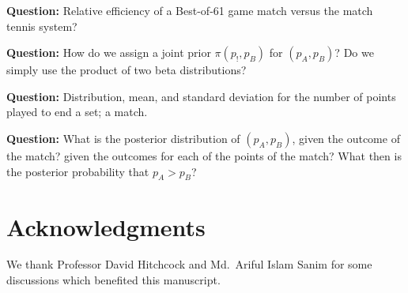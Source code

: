 \documentclass[11pt]{article}
\theoremstyle{plain}
\theoremstyle{definition}
\begin{document}
{{\bf Question:} Relative efficiency of a Best-of-61 game match versus the match tennis system?

{\bf Question:} How do we assign a joint prior $\pi(p_!,p_B)$ for $(p_A,p_B)$? Do we simply use the product of two beta distributions?

{\bf Question:} Distribution, mean, and standard deviation for the number of points played to end a set; a match.

{\bf Question:} What is the posterior distribution of $(p_A,p_B)$, given the outcome of the match? given the outcomes for each of the points of the match? What then is the posterior probability that $p_A > p_B$?

}

\section*{Acknowledgments}

We thank Professor David Hitchcock and Md.\ Ariful Islam Sanim for some discussions which benefited this manuscript.



\end{document}

